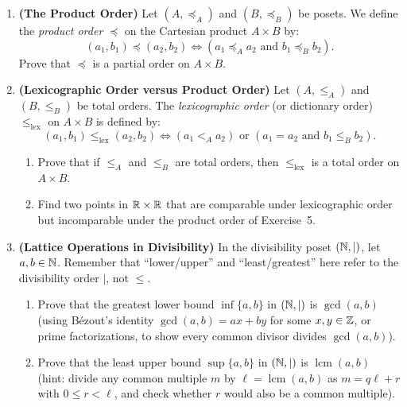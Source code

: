 \begin{enumerate}
\item \textbf{(The Product Order)} Let $(A, \preceq_A)$ and $(B, \preceq_B)$ be posets. We define the \emph{product order} $\preceq$ on the Cartesian product $A \times B$ by:
\[
(a_1, b_1) \preceq (a_2, b_2) \iff (a_1 \preceq_A a_2 \text{ and } b_1 \preceq_B b_2).
\]
Prove that $\preceq$ is a partial order on $A \times B$.

\item \textbf{(Lexicographic Order versus Product Order)} Let $(A, \le_A)$ and $(B, \le_B)$ be total orders. The \emph{lexicographic order} (or dictionary order) $\le_{\text{lex}}$ on $A \times B$ is defined by:
\[
(a_1, b_1) \le_{\text{lex}} (a_2, b_2) \iff (a_1 <_A a_2) \text{ or } (a_1 = a_2 \text{ and } b_1 \le_B b_2).
\]
\begin{enumerate}[label=(\alph*)]
\item Prove that if $\le_A$ and $\le_B$ are total orders, then $\le_{\text{lex}}$ is a total order on $A \times B$.
\item Find two points in $\mathbb{R} \times \mathbb{R}$ that are comparable under lexicographic order but incomparable under the product order of Exercise~5.
\end{enumerate}

\item \textbf{(Lattice Operations in Divisibility)} In the divisibility poset $(\mathbb{N}, \mid)$, let $a, b \in \mathbb{N}$. Remember that ``lower/upper'' and ``least/greatest'' here refer to the divisibility order $\mid$, not $\le$.
\begin{enumerate}[label=(\alph*)]
\item Prove that the greatest lower bound $\inf\{a, b\}$ in $(\mathbb{N}, \mid)$ is $\gcd(a, b)$ (using B\'ezout's identity $\gcd(a, b) = ax + by$ for some $x, y \in \mathbb{Z}$, or prime factorizations, to show every common divisor divides $\gcd(a, b)$).
\item Prove that the least upper bound $\sup\{a, b\}$ in $(\mathbb{N}, \mid)$ is $\operatorname{lcm}(a, b)$ (hint: divide any common multiple $m$ by $\ell = \operatorname{lcm}(a, b)$ as $m = q\ell + r$ with $0 \le r < \ell$, and check whether $r$ would also be a common multiple).
\end{enumerate}
\end{enumerate}

\newpage

